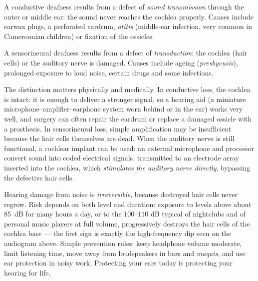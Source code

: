 \documentclass[11pt]{article}
\newcommand{\cle}[1]{{\popxbold\color{popdark}#1}}
\newcounter{popsec}
\newcounter{popsub}
\newcommand{\courssub}[1]{%
  \stepcounter{popsub}%
  \par\vspace{9pt}\noindent{\popxbold\fontsize{11.5}{13}\selectfont\color{popink}{\color{poporange}\thepopsec.\thepopsub}\hspace{6pt}#1}\par\nopagebreak\vspace{4pt}
}
\begin{document}
\courssub{Hearing Defects and Their Correction}

\begin{definition}
A \cle{conductive deafness} results from a defect of \emph{sound transmission} through the outer or middle ear: the sound never reaches the cochlea properly. Causes include earwax plugs, a perforated eardrum, \emph{otitis} (middle-ear infection, very common in Cameroonian children) or fixation of the ossicles.\par
A \cle{sensorineural deafness} results from a defect of \emph{transduction}: the cochlea (hair cells) or the auditory nerve is damaged. Causes include ageing (\emph{presbycusis}), prolonged exposure to loud noise, certain drugs and some infections.
\end{definition}

The distinction matters physically and medically. In conductive loss, the cochlea is intact: it is enough to deliver a stronger signal, so a \cle{hearing aid} (a miniature microphone--amplifier--earphone system worn behind or in the ear) works very well, and surgery can often repair the eardrum or replace a damaged ossicle with a prosthesis. In sensorineural loss, simple amplification may be insufficient because the hair cells themselves are dead. When the auditory nerve is still functional, a \cle{cochlear implant} can be used: an external microphone and processor convert sound into coded electrical signals, transmitted to an electrode array inserted into the cochlea, which \emph{stimulates the auditory nerve directly}, bypassing the defective hair cells.

\begin{savaistu}
Hearing damage from noise is \emph{irreversible}, because destroyed hair cells never regrow. Risk depends on both level and duration: exposure to levels above about \SI{85}{dB} for many hours a day, or to the $100$--$110$ dB typical of nightclubs and of personal music players at full volume, progressively destroys the hair cells of the cochlea base --- the first sign is exactly the high-frequency dip seen on the audiogram above. Simple prevention rules: keep headphone volume moderate, limit listening time, move away from loudspeakers in bars and \emph{maquis}, and use ear protection in noisy work. Protecting your ears today is protecting your hearing for life.
\end{savaistu}
\end{document}
